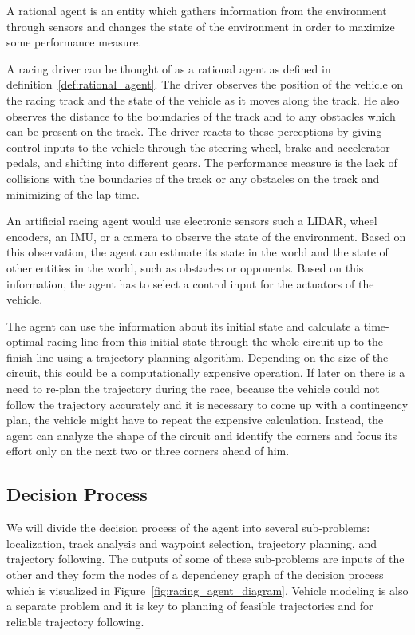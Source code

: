 \begin{defn}\label{def:rational_agent}
    A rational agent is an entity which gathers information from the environment through sensors and changes the state of the environment in order to maximize some performance measure.
\end{defn}

A racing driver can be thought of as a rational agent as defined in definition~\ref{def:rational_agent}. The driver observes the position of the vehicle on the racing track and the state of the vehicle as it moves along the track. He also observes the distance to the boundaries of the track and to any obstacles which can be present on the track. The driver reacts to these perceptions by giving control inputs to the vehicle through the steering wheel, brake and accelerator pedals, and shifting into different gears. The performance measure is the lack of collisions with the boundaries of the track or any obstacles on the track and minimizing of the lap time.

An artificial racing agent would use electronic sensors such a LIDAR, wheel encoders, an IMU, or a camera to observe the state of the environment. Based on this observation, the agent can estimate its state in the world and the state of other entities in the world, such as obstacles or opponents. Based on this information, the agent has to select a control input for the actuators of the vehicle.

The agent can use the information about its initial state and calculate a time-optimal racing line from this initial state through the whole circuit up to the finish line using a trajectory planning algorithm. Depending on the size of the circuit, this could be a computationally expensive operation. If later on there is a need to re-plan the trajectory during the race, because the vehicle could not follow the trajectory accurately and it is necessary to come up with a contingency plan, the vehicle might have to repeat the expensive calculation. Instead, the agent can analyze the shape of the circuit and identify the corners and focus its effort only on the next two or three corners ahead of him.

\subsection{Decision Process}

We will divide the decision process of the agent into several sub-problems: localization, track analysis and waypoint selection, trajectory planning, and trajectory following. The outputs of some of these sub-problems are inputs of the other and they form the nodes of a dependency graph of the decision process which is visualized in Figure~\ref{fig:racing_agent_diagram}. Vehicle modeling is also a separate problem and it is key to planning of feasible trajectories and for reliable trajectory following.

